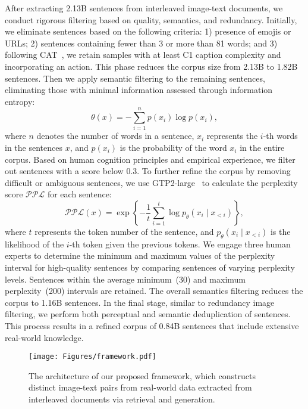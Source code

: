 After extracting 2.13B sentences from interleaved image-text documents, we conduct rigorous filtering based on quality, semantics, and redundancy. Initially, we eliminate sentences based on the following criteria: 1) presence of emojis or URLs; 2) sentences containing fewer than 3 or more than 81 words; and 3) following CAT~\cite{CAT_rule}, we retain samples with at least C1 caption complexity and incorporating an action. This phase reduces the corpus size from 2.13B to 1.82B sentences. Then we apply semantic filtering to the remaining sentences, eliminating those with minimal information assessed through information entropy:
\begin{equation}
\label{equation:IE}
\theta(x) = -\sum_{i=1}^n p(x_{i}) \log p(x_{i}),
\end{equation}
where $n$ denotes the number of words in a sentence, $x_{i}$ represents the $i$-th words in the sentences $x$, and $p(x_{i})$ is the probability of the word $x_i$ in the entire corpus. Based on human cognition principles and empirical experience, we filter out sentences with a score below 0.3. To further refine the corpus by removing difficult or ambiguous sentences, we use GTP2-large~\cite{gpt2} to calculate the perplexity score $\mathcal{PPL}$ for each sentence:
\begin{equation}
\label{equation:perplexity}
\mathcal{PPL}(x) = \exp \left\{-\frac{1}{t} \sum_{i=1}^{t} \log p_{\theta}(x_i \mid x_{<i}) \right\},
\end{equation}
where $t$ represents the token number of the sentence, and $p_{\theta}(x_i \mid x_{<i})$ is the likelihood of the $i$-th token given the previous tokens. We engage three human experts to determine the minimum and maximum values of the perplexity interval for high-quality sentences by comparing sentences of varying perplexity levels. Sentences within the average minimum~(30) and maximum perplexity~(200) intervals are retained. The overall semantics filtering reduces the corpus to 1.16B sentences. In the final stage, similar to redundancy image filtering, we perform both perceptual and semantic deduplication of sentences. This process results in a refined corpus of 0.84B sentences that include extensive real-world knowledge.

\begin{figure}[t]
    \centering  \texttt{[image: Figures/framework.pdf]}
    \vspace{-3mm}
    \caption{The architecture of our proposed framework, which constructs distinct image-text pairs from real-world data extracted from interleaved documents via retrieval and generation.}
    \label{fig: pipeline}
    \vspace{-3mm}
\end{figure}


